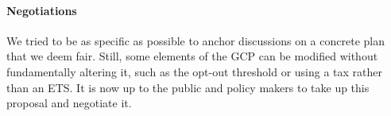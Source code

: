 \documentclass[12pt,english]{article}
\begin{document}
\paragraph{Negotiations}

We tried to be as specific as possible to anchor discussions on a concrete plan that we deem fair. Still, some elements of the GCP can be modified without fundamentally altering it, such as the opt-out threshold or using a tax rather than an ETS. It is now up to the public and policy makers to take up this proposal and negotiate it. 

\renewcommand{\url}[1]{\href{#1}{Link}} %
{\small 

}
\end{document}

